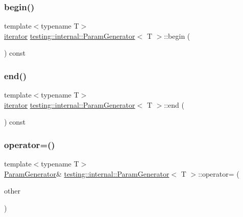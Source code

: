 \subsubsection{\texorpdfstring{begin()}{begin()}}
{\footnotesize\ttfamily template$<$typename T$>$ \\
\hyperlink{classtesting_1_1internal_1_1ParamGenerator_a448b08a8eaae1f1d27840d4dbd66c357}{iterator} \hyperlink{classtesting_1_1internal_1_1ParamGenerator}{testing\+::internal\+::\+Param\+Generator}$<$ T $>$\+::begin (\begin{DoxyParamCaption}{ }\end{DoxyParamCaption}) const\hspace{0.3cm}{\ttfamily [inline]}}

\mbox{\label{classtesting_1_1internal_1_1ParamGenerator_aaf8f75df1099a07ff771a550b48f9fbe}} 
\subsubsection{\texorpdfstring{end()}{end()}}
{\footnotesize\ttfamily template$<$typename T$>$ \\
\hyperlink{classtesting_1_1internal_1_1ParamGenerator_a448b08a8eaae1f1d27840d4dbd66c357}{iterator} \hyperlink{classtesting_1_1internal_1_1ParamGenerator}{testing\+::internal\+::\+Param\+Generator}$<$ T $>$\+::end (\begin{DoxyParamCaption}{ }\end{DoxyParamCaption}) const\hspace{0.3cm}{\ttfamily [inline]}}

\mbox{\label{classtesting_1_1internal_1_1ParamGenerator_a590a03c6e0a3a3ac6279943ad1f01dc8}} 
\subsubsection{\texorpdfstring{operator=()}{operator=()}}
{\footnotesize\ttfamily template$<$typename T$>$ \\
\hyperlink{classtesting_1_1internal_1_1ParamGenerator}{Param\+Generator}\& \hyperlink{classtesting_1_1internal_1_1ParamGenerator}{testing\+::internal\+::\+Param\+Generator}$<$ T $>$\+::operator= (\begin{DoxyParamCaption}\item[{const \hyperlink{classtesting_1_1internal_1_1ParamGenerator}{Param\+Generator}$<$ T $>$ \&}]{other }\end{DoxyParamCaption})\hspace{0.3cm}{\ttfamily [inline]}}



